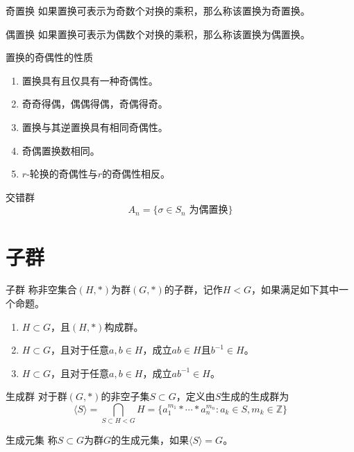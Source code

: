 \documentclass[lang = cn, scheme = chinese, thmcnt = section]{elegantbook}
\newcommand{\rang}{\rangle}            %
\begin{document}
\begin{definition}{奇置换}
	如果置换可表示为奇数个对换的乘积，那么称该置换为奇置换。
\end{definition}

\begin{definition}{偶置换}
	如果置换可表示为偶数个对换的乘积，那么称该置换为偶置换。
\end{definition}

\begin{proposition}{置换的奇偶性的性质}
	\begin{enumerate}
		\item 置换具有且仅具有一种奇偶性。
		\item 奇奇得偶，偶偶得偶，奇偶得奇。
		\item 置换与其逆置换具有相同奇偶性。
		\item 奇偶置换数相同。
		\item $r$-轮换的奇偶性与$r$的奇偶性相反。
	\end{enumerate}
\end{proposition}

\begin{definition}{交错群}
	$$
	A_n=\{ \sigma\in S_n\text{ 为偶置换} \}
	$$
\end{definition}

\section{子群}

\begin{definition}{子群}
	称非空集合$(H,*)$为群$(G,*)$的子群，记作$H<G$，如果满足如下其中一个命题。
	\begin{enumerate}
		\item $H\subset G$，且$(H,*)$构成群。
		\item $H\subset G$，且对于任意$a,b\in H$，成立$ab\in H$且$b^{-1}\in H$。
		\item $H\subset G$，且对于任意$a,b\in H$，成立$a b^{-1}\in H$。
	\end{enumerate}
\end{definition}

\begin{definition}{生成群}
	对于群$(G,*)$的非空子集$S\subset G$，定义由$S$生成的生成群为
	$$
	\langle S \rang=\bigcap_{S\subset H <G}H=\{ a_1^{m_1}*\cdots * a_{n}^{m_n}:a_k\in S,m_k\in\mathbb{Z} \}
	$$
\end{definition}

\begin{definition}{生成元集}
	称$S\subset G$为群$G$的生成元集，如果$\langle S \rang=G$。
\end{definition}
\end{document}
